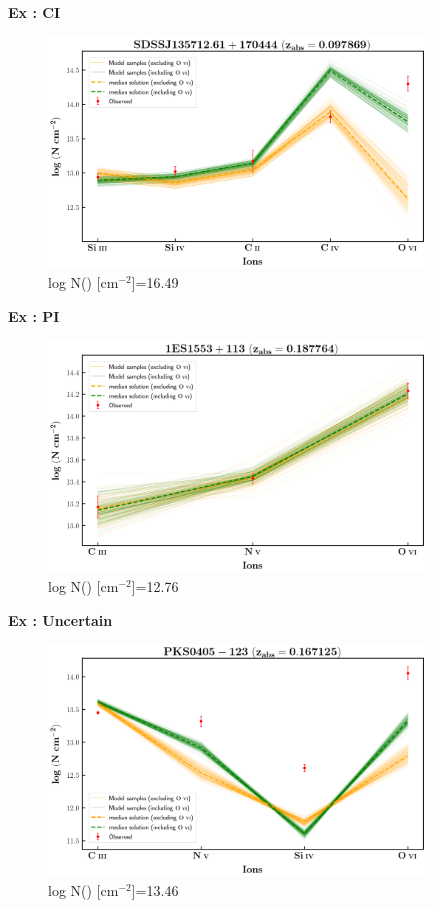 \begin{frame}[noframenumbering]{\textbf{Ex : CI}}

\begin{figure}[!htbp]
    \centering
    \includegraphics[width=10cm]{Figures/s135712-z=0.097869-compII.png}
    \vspace*{-1mm}
    \caption{log N() [cm$^{-2}$]=16.49}
\end{figure}  

\end{frame}


\begin{frame}[noframenumbering]{\textbf{Ex : PI}}

\begin{figure}[!htbp]
    \centering
    \includegraphics[width=10cm]{Figures/1es1553-z=0.187764-compI.png}
    \vspace*{-1mm}
    \caption{log N() [cm$^{-2}$]=12.76}
\end{figure}  

\end{frame}


\begin{frame}[noframenumbering]{\textbf{Ex : Uncertain}}

    \begin{figure}[!htbp]
    \centering
    \includegraphics[width=10cm]{Figures/pks0405-z=0.167125-compII.png}
    \vspace*{-1mm}
    \caption{log N() [cm$^{-2}$]=13.46}
    \end{figure}  
    
    \end{frame}
